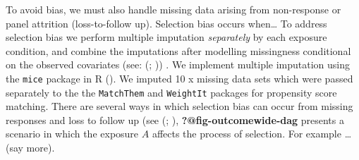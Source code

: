\documentclass[
  singlecolumn,
  9pt]{article}
\begin{document}
To avoid bias, we must also handle missing data arising from
non-response or panel attrition (loss-to-follow up). Selection bias
occurs when\ldots{} To address selection bias we perform multiple
imputation \emph{separately} by each exposure condition, and combine the
imputations after modelling missingness conditional on the observed
covariates (see: (; )) . We
implement multiple imputation using the \texttt{mice} package in R
(). We imputed 10 x missing
data sets which were passed separately to the the \texttt{MatchThem} and
\texttt{WeightIt} packages for propensity score matching. There are
several ways in which selection bias can occur from missing responses
and loss to follow up (see (; ),
\textbf{?@fig-outcomewide-dag} presents a scenario in which the exposure
\(A\) affects the process of selection. For example \ldots{} (say more).
\end{document}

